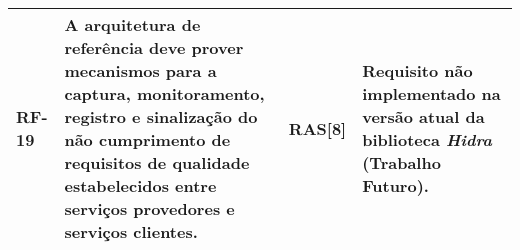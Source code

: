 \begin{longtable}{ | l | p{6cm} | p{2cm} | p{4cm} |}
	RF-19
	& A arquitetura de referência deve prover mecanismos para a  captura, monitoramento, registro e sinalização do não  cumprimento de requisitos de qualidade estabelecidos entre  serviços provedores e serviços clientes.
	& RAS[8]
	& Requisito não implementado na versão atual da biblioteca \textit{Hidra} (Trabalho Futuro). \\ \hline


\end{longtable}
